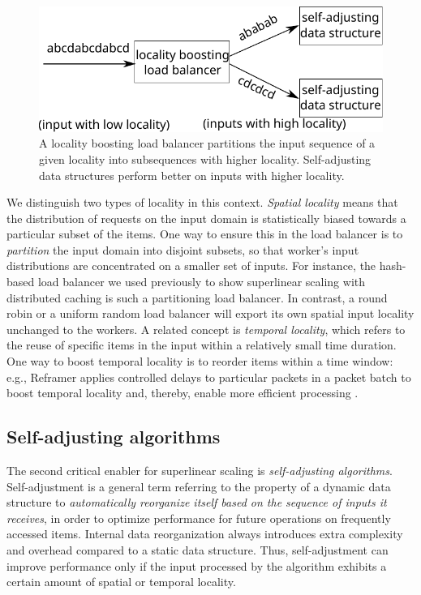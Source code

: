 \begin{figure}
  \centering
  \includegraphics[width=.85\linewidth]{fig/schema.pdf}
  \caption{A locality boosting load balancer partitions the input sequence of a given locality into subsequences with higher locality. Self-adjusting data structures perform better on inputs with higher locality.}
  \label{fig:locality-boosting-lb}
\end{figure}

We distinguish two types of locality in this context. \emph{Spatial locality} means that the distribution of requests on the input domain is statistically biased towards a particular subset of the items. One way to ensure this in the load balancer is to \emph{partition} the input domain into disjoint subsets, so that worker's input distributions are concentrated on a smaller set of inputs. For instance, the hash-based load balancer we used previously to show superlinear scaling with distributed caching is such a partitioning load balancer. In contrast, a round robin or a uniform random load balancer will export its own spatial input locality unchanged to the workers. A related concept is \emph{temporal locality}, which refers to the reuse of specific items in the input within a relatively small time duration. One way to boost temporal locality is to reorder items within a time window: e.g., Reframer applies controlled delays to particular packets in a packet batch to boost temporal locality and, thereby, enable more efficient processing \cite{276946,246322}.

\subsection{Self-adjusting algorithms}
\label{sec:sa-alg}

The second critical enabler for superlinear scaling is \emph{self-adjusting algorithms}. Self-adjustment is a general term referring to the property of a dynamic data structure to \emph{automatically reorganize itself based on the sequence of inputs it receives}, in order to optimize performance for future operations on frequently accessed items. Internal data reorganization always introduces extra complexity and overhead compared to a static data structure. Thus, self-adjustment can improve performance only if the input processed by the algorithm exhibits a certain amount of spatial or temporal locality.

